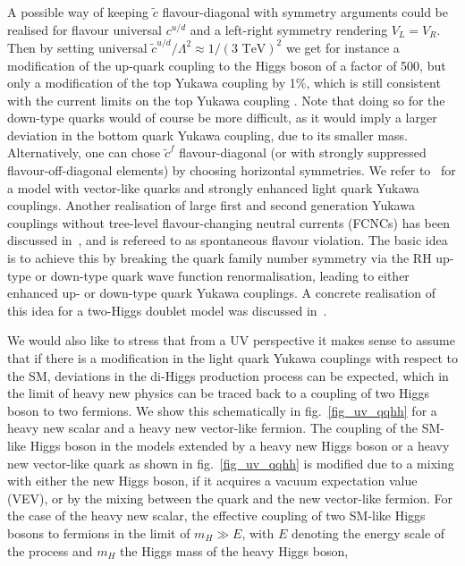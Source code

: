 \par
A possible way of keeping $\tilde{c}$ flavour-diagonal with symmetry arguments could be realised for flavour universal $c^{u/d}$ and a left-right symmetry rendering $V_L=V_R$.
Then by setting universal $\tilde{c}^{u/d}/\Lambda^2\approx1/(3\text{ TeV})^2$ we get for instance a modification of the up-quark coupling to the Higgs boson of a factor of 500, but only a  modification of the top Yukawa coupling by 1\%, which is still consistent with the current limits on the top Yukawa coupling \cite{ATLAS-CONF-2018-031, CERN-EP-2019-119}. Note that doing so for the down-type quarks would of course be more difficult, as it would imply a larger deviation in the bottom quark Yukawa coupling, due to its smaller mass.
Alternatively, one can chose $\tilde{c}^f$ flavour-diagonal (or with strongly suppressed flavour-off-diagonal elements) by choosing horizontal symmetries. We refer to~\cite{Bar-Shalom:2018rjs} for a model with vector-like quarks and strongly enhanced light quark Yukawa couplings.
Another realisation of large first and second generation Yukawa couplings without tree-level flavour-changing neutral currents (FCNCs) has been discussed in~\cite{Egana-Ugrinovic:2018znw}, and is refereed to as spontaneous flavour violation.  The basic idea is to achieve this by breaking the quark family number symmetry via the RH up-type or down-type quark wave function renormalisation, leading to either enhanced up- or down-type quark Yukawa couplings. A concrete realisation of this idea for a two-Higgs doublet model was discussed in~\cite {Egana-Ugrinovic:2019dqu}.
\par
We would also like to stress that from a UV perspective it makes sense to assume that if there is a modification in the light quark Yukawa couplings with respect to the SM, deviations in the di-Higgs production process can be expected, which in the limit of heavy new physics can be traced back to a coupling of two Higgs boson to two fermions. We show this schematically in fig.~\ref{fig_uv_qqhh} for a heavy new scalar and a heavy new vector-like fermion. The coupling of the SM-like Higgs boson in the models extended by a heavy new Higgs boson or a heavy new vector-like quark as shown in fig.~\ref{fig_uv_qqhh}  is modified due to a mixing with either the new Higgs boson, if it acquires a vacuum expectation value (VEV), or by the mixing between the quark and the new vector-like fermion.
For the case of the heavy new scalar, the effective coupling of two SM-like Higgs bosons to fermions in the limit of $m_H \gg E$, with $E$ denoting the energy scale of the process and $m_H$ the Higgs mass of the heavy Higgs boson,
